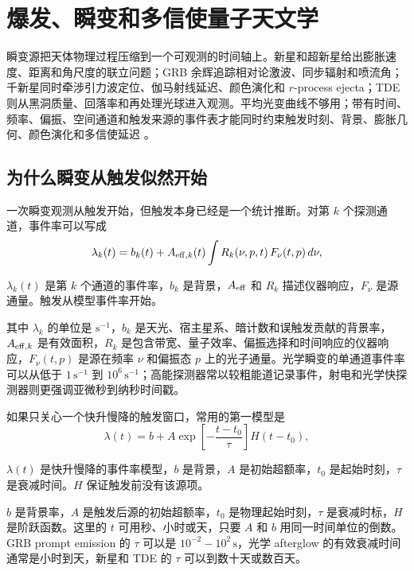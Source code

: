 \chapter{爆发、瞬变和多信使量子天文学}
\label{chap:13}

\begin{chapteropening}
瞬变源把天体物理过程压缩到一个可观测的时间轴上。新星和超新星给出膨胀速度、距离和角尺度的联立问题；GRB 余辉追踪相对论激波、同步辐射和喷流角；千新星同时牵涉引力波定位、伽马射线延迟、颜色演化和 \(r\)-process ejecta；TDE 则从黑洞质量、回落率和再处理光球进入观测。平均光变曲线不够用；带有时间、频率、偏振、空间通道和触发来源的事件表才能同时约束触发时刻、背景、膨胀几何、颜色演化和多信使延迟 \citep{2014Natur.514..339C,2014Sci...345..554A,2008Sci...321..223S,1998ApJ...497L..17S,2004RvMP...76.1143P,2017PhRvL.119p1101A,2017ApJ...848L..12A,2017Natur.551...75S,2021ARA&A..59...21G}。
\end{chapteropening}

\section{为什么瞬变从触发似然开始}

一次瞬变观测从触发开始，但触发本身已经是一个统计推断。对第 \(k\) 个探测通道，事件率可以写成
\begin{equation}
  \lambda_k(t)=b_k(t)+A_{{\rm eff},k}(t)
  \int R_k(\nu,p,t)\,F_\nu(t,p)\,d\nu ,
  \label{eq:ch13-rate-response}
\end{equation}
\begin{formulaexplain}
\(\lambda_k(t)\) 是第 \(k\) 个通道的事件率，\(b_k\) 是背景，\(A_{\rm eff}\) 和 \(R_k\) 描述仪器响应，\(F_\nu\) 是源通量。触发从模型事件率开始。
\end{formulaexplain}
其中 \(\lambda_k\) 的单位是 \(\mathrm{s^{-1}}\)，\(b_k\) 是天光、宿主星系、暗计数和误触发贡献的背景率，\(A_{{\rm eff},k}\) 是有效面积，\(R_k\) 是包含带宽、量子效率、偏振选择和时间响应的仪器响应，\(F_\nu(t,p)\) 是源在频率 \(\nu\) 和偏振态 \(p\) 上的光子通量。光学瞬变的单通道事件率可以从低于 \(1\,\mathrm{s^{-1}}\) 到 \(10^6\,\mathrm{s^{-1}}\)；高能探测器常以较粗能道记录事件，射电和光学快探测器则更强调亚微秒到纳秒时间戳。

如果只关心一个快升慢降的触发窗口，常用的第一模型是
\begin{equation}
  \lambda(t)=b+A\exp\!\left[-\frac{t-t_0}{\tau}\right]H(t-t_0),
  \label{eq:ch13-exponential-rate}
\end{equation}
\begin{formulaexplain}
\(\lambda(t)\) 是快升慢降的事件率模型，\(b\) 是背景，\(A\) 是初始超额率，\(t_0\) 是起始时刻，\(\tau\) 是衰减时间。\(H\) 保证触发前没有该源项。
\end{formulaexplain}
\(b\) 是背景率，\(A\) 是触发后源的初始超额率，\(t_0\) 是物理起始时刻，\(\tau\) 是衰减时标，\(H\) 是阶跃函数。这里的 \(t\) 可用秒、小时或天，只要 \(A\) 和 \(b\) 用同一时间单位的倒数。GRB prompt emission 的 \(\tau\) 可以是 \(10^{-2}-10^2\,\mathrm{s}\)，光学 afterglow 的有效衰减时间通常是小时到天，新星和 TDE 的 \(\tau\) 可以到数十天或数百天。

